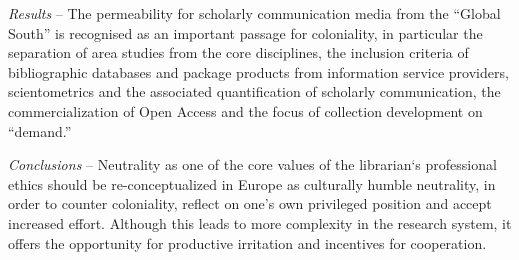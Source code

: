 \textit{Results} -- The permeability for scholarly communication media from the
\enquote{Global South} is recognised as an important passage for coloniality,
in particular the separation of area studies from the core disciplines,
the inclusion criteria of bibliographic databases and package products
from information service providers, scientometrics and the associated
quantification of scholarly communication, the commercialization of Open
Access and the focus of collection development on \enquote{demand.}

\textit{Conclusions} -- Neutrality as one of the core values of the librarian`s
professional ethics should be re-conceptualized in Europe as culturally
humble neutrality, in order to counter coloniality, reflect on one's own
privileged position and accept increased effort. Although this leads to
more complexity in the research system, it offers the opportunity for
productive irritation and incentives for cooperation.
